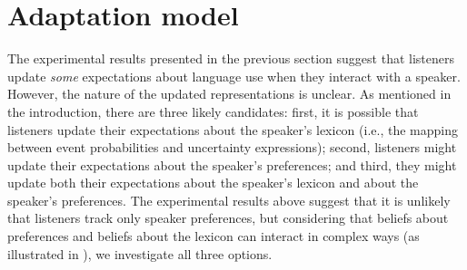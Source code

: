\section{Adaptation model}
\label{sec:model-adapt}



The experimental results presented in the previous section suggest that listeners update
\textit{some} expectations about language use when they interact with a speaker. 
However, the nature of the updated representations is unclear. As mentioned in the introduction, there are three likely candidates:
first, it is possible that listeners update their expectations about the speaker's lexicon 
(i.e., the mapping between event probabilities and uncertainty expressions);  second, listeners
 might  update their expectations about the speaker's preferences; 
and third, they might update both their expectations about the speaker's lexicon 
and about the speaker's preferences. The experimental results above suggest that it is unlikely that listeners track only speaker preferences, but considering
that beliefs about preferences and beliefs about the lexicon can interact in complex ways (as illustrated in ), we investigate all three options.

